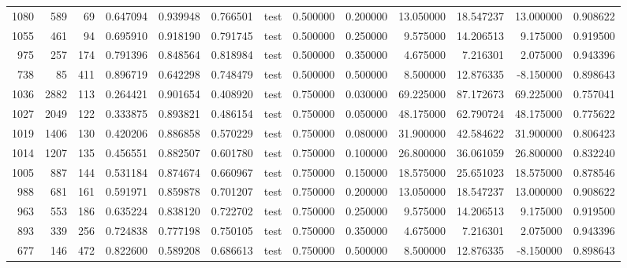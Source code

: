 \begin{tabular}{rrrrrrlrrrrrr}
1080 & 589 & 69 & 0.647094 & 0.939948 & 0.766501 & test & 0.500000 & 0.200000 & 13.050000 & 18.547237 & 13.000000 & 0.908622 \\
1055 & 461 & 94 & 0.695910 & 0.918190 & 0.791745 & test & 0.500000 & 0.250000 & 9.575000 & 14.206513 & 9.175000 & 0.919500 \\
975 & 257 & 174 & 0.791396 & 0.848564 & 0.818984 & test & 0.500000 & 0.350000 & 4.675000 & 7.216301 & 2.075000 & 0.943396 \\
738 & 85 & 411 & 0.896719 & 0.642298 & 0.748479 & test & 0.500000 & 0.500000 & 8.500000 & 12.876335 & -8.150000 & 0.898643 \\
1036 & 2882 & 113 & 0.264421 & 0.901654 & 0.408920 & test & 0.750000 & 0.030000 & 69.225000 & 87.172673 & 69.225000 & 0.757041 \\
1027 & 2049 & 122 & 0.333875 & 0.893821 & 0.486154 & test & 0.750000 & 0.050000 & 48.175000 & 62.790724 & 48.175000 & 0.775622 \\
1019 & 1406 & 130 & 0.420206 & 0.886858 & 0.570229 & test & 0.750000 & 0.080000 & 31.900000 & 42.584622 & 31.900000 & 0.806423 \\
1014 & 1207 & 135 & 0.456551 & 0.882507 & 0.601780 & test & 0.750000 & 0.100000 & 26.800000 & 36.061059 & 26.800000 & 0.832240 \\
1005 & 887 & 144 & 0.531184 & 0.874674 & 0.660967 & test & 0.750000 & 0.150000 & 18.575000 & 25.651023 & 18.575000 & 0.878546 \\
988 & 681 & 161 & 0.591971 & 0.859878 & 0.701207 & test & 0.750000 & 0.200000 & 13.050000 & 18.547237 & 13.000000 & 0.908622 \\
963 & 553 & 186 & 0.635224 & 0.838120 & 0.722702 & test & 0.750000 & 0.250000 & 9.575000 & 14.206513 & 9.175000 & 0.919500 \\
893 & 339 & 256 & 0.724838 & 0.777198 & 0.750105 & test & 0.750000 & 0.350000 & 4.675000 & 7.216301 & 2.075000 & 0.943396 \\
677 & 146 & 472 & 0.822600 & 0.589208 & 0.686613 & test & 0.750000 & 0.500000 & 8.500000 & 12.876335 & -8.150000 & 0.898643 \\
\bottomrule
\end{tabular}

